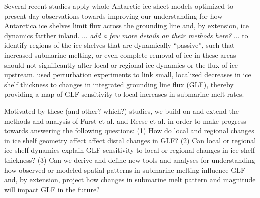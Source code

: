 \documentclass[review,oneside]{igs}
\begin{document}
Several recent studies apply whole-Antarctic ice sheet models optimized to present-day observations towards improving our understanding for how Antarctica ice shelves limit flux across the grounding line and, by extension, ice dynamics farther inland. \cite{furst2016} ... \textit{add a few more details on their methods here?} ... to identify regions of the ice shelves that are dynamically ``passive'', such that increased submarine melting, or even complete removal of ice in these areas should not significantly alter local or regional ice dynamics or the flux of ice upstream. \cite{reese2018} used perturbation experiments to link small, localized decreases in ice shelf thickness to changes in integrated grounding line flux (GLF), thereby providing a map of GLF sensitivity to local increases in submarine melt rates. 

Motivated by these (and other? which?) studies, we build on and extend the methods and analysis of Furst et al. and Reese et al. in order to make progress towards answering the following questions: 
(1) How do local and regional changes in ice shelf geometry affect affect distal changes in GLF? (2) Can local or regional ice shelf dynamics explain GLF sensitivity to local or regional changes in ice shelf thickness? (3) Can we derive and define new tools and analyses for understanding how observed or modeled spatial patterns in submarine melting influence GLF and, by extension, project how changes in submarine melt pattern and magnitude will impact GLF in the future?     
\end{document}
